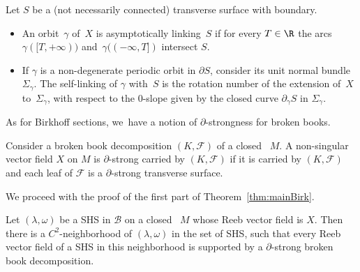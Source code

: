 \begin{defi}
Let $S$ be a (not necessarily connected)
transverse surface with boundary.
\begin{itemize}
\item
An orbit~$\gamma$ of~$X$ is asymptotically linking~$S$ if for every $T\in\R$ the arcs $\gamma([T, +\infty))$ and~$\gamma((-\infty, T])$ intersect $S$.

\item
If $\gamma$ is a non-degenerate periodic orbit in $\partial S$, consider its unit normal bundle~$\Sigma_\gamma$. The self-linking of $\gamma$ with~$S$ is the rotation number of the extension of~$X$ to~$\Sigma_\gamma$, with respect to the 0-slope given by the closed curve $\partial_\gamma S$ in $\Sigma_\gamma$.
\end{itemize}

\end{defi}

As for Birkhoff sections, we~have a notion of $\partial$-strongness for broken books.

\begin{defi}\label{defn-bbddelta}
Consider a broken book decomposition $(K,\mathcal{F})$ of a closed \threemanifold~$M$. A non-singular vector field $X$ on $M$ is $\partial$-strong carried by $(K,\mathcal{F})$ if it is carried by $(K,\mathcal{F})$ and each leaf of $\mathcal{F}$ is a $\partial$-strong transverse surface.
\end{defi}

We proceed with the proof of the first part of Theorem~\ref{thm:mainBirk}.

\begin{theorem}\label{thm:bbook}
Let $(\lambda,\omega)$ be a SHS in $\mathcal{B}$ on a closed \threemanifold~$M$ whose Reeb vector field is $X$. Then there is a $C^2$-neighborhood of $(\lambda,\omega)$ in the set of SHS, such that every Reeb vector field of a SHS in this neighborhood is supported by a $\partial$-strong broken book decomposition.
\end{theorem}

